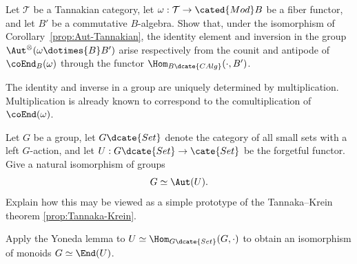 \begin{Exercises}
	\item Let $\mathcal{T}$ be a Tannakian category, let
	$\omega:\mathcal{T}\to\cated{Mod}B$ be a fiber functor, and let $B'$ be a commutative $B$-algebra. Show that, under the isomorphism of Corollary~\ref{prop:Aut-Tannakian}, the identity element and inversion in the group
	$\Aut^{\otimes}(\omega\dotimes{B}B')$ arise respectively from the counit and antipode of $\coEnd_B(\omega)$ through the functor
	$\Hom_{B\dcate{CAlg}}(\mathord\cdot,B')$.
	\begin{hint}
		The identity and inverse in a group are uniquely determined by multiplication. Multiplication is already known to correspond to the comultiplication of $\coEnd(\omega)$.
	\end{hint}

	\item Let $G$ be a group, let $G\dcate{Set}$ denote the category of all small sets with a left $G$-action, and let $U:G\dcate{Set}\to\cate{Set}$ be the forgetful functor. Give a natural isomorphism of groups
	\[ G\simeq\Aut(U). \]
	Explain how this may be viewed as a simple prototype of the Tannaka--Krein theorem \ref{prop:Tannaka-Krein}.
	\begin{hint}
		Apply the Yoneda lemma to
		$U\simeq\Hom_{G\dcate{Set}}(G,\mathord\cdot)$ to obtain an isomorphism of monoids $G\simeq\End(U)$.
	\end{hint}
\end{Exercises}
